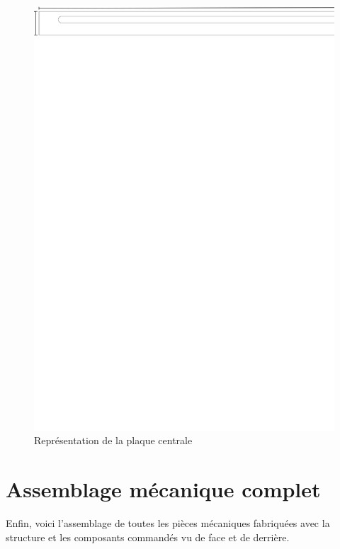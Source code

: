 \begin{figure}[H]
  \centering
  \includegraphics[width = \textwidth]{assets/figures/PlaquePassageMoteur.svg}
  \caption{Représentation de la plaque centrale}
  \label{fig:PLaPassMot}
\end{figure}

\section{Assemblage mécanique complet}\label{sec:AssMecComp}
Enfin, voici l'assemblage de toutes les pièces mécaniques fabriquées avec la structure et les composants commandés vu de face et de derrière.

